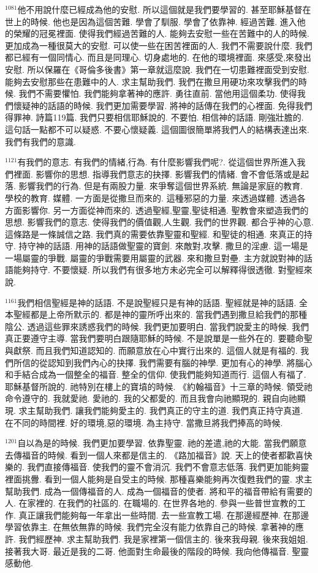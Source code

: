 \documentclass{book}
\begin{document}
$^{1081}$他不用說什麼已經成為他的安慰.
所以這個就是我們要學習的.
甚至耶穌基督在世上的時候.
他也是因為這個苦難.
學會了馴服.
學會了依靠神.
經過苦難.
進入他的榮耀的冠冕裡面.
使得我們經過苦難的人.
能夠去安慰一些在苦難中的人的時候.
更加成為一種很莫大的安慰.
可以使一些在困苦裡面的人.
我們不需要說什麼.
我們都已經有一個同情心.
而且是同理心.
切身處地的.
在他的環境裡面.
來感受,來發出安慰.
所以保羅在《哥倫多後書》第一章就這麼說.
我們在一切患難裡面受到安慰.
能夠去安慰那些在患難中的人.
求主幫助我們.
我們在撒旦用硬功來攻擊我們的時候.
我們不需要懼怕.
我們能夠拿著神的應許.
勇往直前.
當他用這個柔功.
使得我們懷疑神的話語的時候.
我們更加需要學習.
將神的話傳在我們的心裡面.
免得我們得罪神.
詩篇119篇.
我們只要相信耶穌說的.
不要怕.
相信神的話語.
剛強壯膽的.
這句話一點都不可以疑惑.
不要心懷疑義.
這個圖很簡單將我們人的結構表達出來.
我們有我們的意識.

$^{1121}$有我們的意志.
有我們的情緒,行為.
有什麼影響我們呢?.
從這個世界所進入我們裡面.
影響你的思想.
指導我們意志的抉擇.
影響我們的情緒.
會不會低落或是起落.
影響我們的行為.
但是有兩股力量.
來爭奪這個世界系統.
無論是家庭的教育.
學校的教育.
媒體.
一方面是從撒旦而來的.
這種邪惡的力量.
來透過媒體.
透過各方面影響你.
另一方面從神而來的.
透過聖經,聖靈,聖徒相通.
聖教會來塑造我們的思想.
影響我們的意志.
使得我們的價值觀,人生觀.
我們的世界觀.
都合乎神的心意.
這條路是一條誠信之路.
我們真的需要依靠聖靈和聖經.
和聖徒的相通.
來真正的持守.
持守神的話語.
用神的話語做聖靈的寶劍.
來敵對,攻擊.
撒旦的淫慮.
這一場是一場屬靈的爭戰.
屬靈的爭戰需要用屬靈的武器.
來和撒旦對壘.
主方就說對神的話語能夠持守.
不要懷疑.
所以我們有很多地方未必完全可以解釋得很透徹.
對聖經來說.

$^{1161}$我們相信聖經是神的話語.
不是說聖經只是有神的話語.
聖經就是神的話語.
全本聖經都是上帝所默示的.
都是神的靈所呼出來的.
當我們遇到撒旦給我們的那種陰公.
透過這些罪來誘惑我們的時候.
我們更加要明白.
當我們說愛主的時候.
我們真正要遵守主導.
當我們要明白跟隨耶穌的時候.
不是說單是一些外在的.
要聽命聖與獻祭.
而且我們知道認知的.
而願意放在心中實行出來的.
這個人就是有福的.
我們所信的從認知到我們內心的抉擇.
我們需要有腦的神學.
更加有心的神學.
將腦心和手結合成為一個整全的福音.
整全的信仰.
使我們能夠知道而行.
這個人有福了.
耶穌基督所說的.
祂特別在樓上的寶墳的時候.
《約翰福音》十三章的時候.
領受祂命令遵守的.
我就愛祂.
愛祂的.
我的父都愛的.
而且我會向祂顯現的.
親自向祂顯現.
求主幫助我們.
讓我們能夠愛主的.
我們真正的守主的道.
我們真正持守真道.
在不同的時間裡.
好的環境,惡的環境.
為主持守.
當撒旦將我們捧高的時候.

$^{1201}$自以為是的時候.
我們更加要學習.
依靠聖靈.
祂的差遣,祂的大能.
當我們願意去傳福音的時候.
看到一個人來都是信主的.
《路加福音》說.
天上的使者都歡喜快樂的.
我們直接傳福音.
使我們的靈不會消沉.
我們不會意志低落.
我們更加能夠靈裡面挑釁.
看到一個人能夠是自受主的時候.
那種喜樂能夠再次復甦我們的靈.
求主幫助我們.
成為一個傳福音的人.
成為一個福音的使者.
將和平的福音帶給有需要的人.
在家裡的.
在我們的社區的.
在職場的.
在世界各地的.
參與一些普世宣教的工作.
真正讓我們能夠每一年拿出一些時間.
去一些宣教工場.
在那邊經歷神.
在那邊學習依靠主.
在無依無靠的時候.
我們完全沒有能力依靠自己的時候.
拿著神的應許.
我們經歷神.
求主幫助我們.
我是家裡第一個信主的.
後來我母親.
後來我姐姐.
接著我大哥.
最近是我的二哥.
他面對生命最後的階段的時候.
我向他傳福音.
聖靈感動他.
\end{document}
